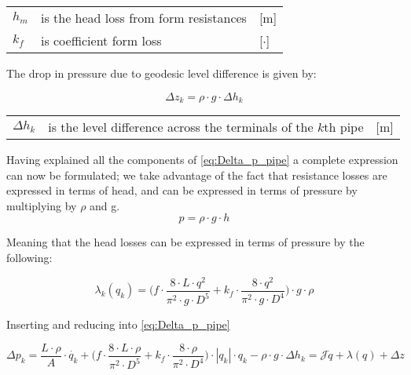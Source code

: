 \begin{center}
	\begin{tabular}{l p{8cm} l}
		$h_{m}$ & is the head loss from form resistances & [\si{m}]\\
		$k_{f}$ &  is coefficient form loss & [$\cdot$]\\
	\end{tabular}
\end{center}

\clearpage

The drop in pressure due to geodesic level difference is given by:

\begin{equation}
	\Delta{z_{k}} = \rho \cdot g \cdot \Delta{h_{k}}
\end{equation}

\begin{center}
	\begin{tabular}{l p{8cm} l}
		$\Delta{h_{k}}$ &  is the level difference across the terminals of the $k$th pipe & [\si{m}]\\
	\end{tabular}
\end{center}

Having explained all the components of \eqref{eq:Delta_p_pipe} a complete expression can now be formulated; we take advantage of the fact that resistance losses are expressed in terms of head, and can be expressed in terms of pressure by multiplying by $\rho$ and g. \begin{equation}
	p = \rho \cdot g \cdot h  
\end{equation}

Meaning that the head losses can be expressed in terms of pressure by the following:

\begin{equation}
\lambda_{k}(q_{k})  =	\Big(f \cdot \frac{8\cdot L\cdot q^{2}}{\pi^{2}\cdot g \cdot D^{5}} + k_{f}\cdot \frac{8\cdot q^{2}}{\pi^{2}\cdot g \cdot D^{4}}\Big)\cdot g \cdot \rho
\end{equation}

Inserting and reducing into \cref{eq:Delta_p_pipe}

\begin{equation}
	\Delta{p_{k}} = \frac{L\cdot \rho}{A}\cdot \dot{q_{k}}
	+\Big(f \cdot \frac{8\cdot L\cdot \rho}{\pi^{2} \cdot D^{5}} + k_{f}\cdot \frac{8\cdot \rho}{\pi^{2} \cdot D^{4}}\Big)\cdot |q_{k}|\cdot q_{k} 
	- \rho \cdot g \cdot \Delta{h_{k}} = \mathcal{J}\dot{q} + \lambda(q) + \Delta z
\end{equation}

